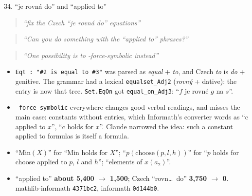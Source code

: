 \documentclass[10pt,aspectratio=169]{beamer}
\newcommand{\bad}[1]{\textcolor{warn}{#1}}
\newcommand{\ok}[1]{\textcolor{good}{#1}}
\newcommand{\commit}[1]{\texttt{\footnotesize #1}}
\newcommand{\prompt}[1]{\begin{quote}\small\itshape ``#1''\end{quote}}
\begin{document}
\begin{frame}{34. ``je rovná do'' and ``applied to''}
  \footnotesize
  \prompt{fix the Czech ``je rovná do'' equations} \prompt{Can you do something with the
  ``applied to'' phrases?} \prompt{One possibility is to -force-symbolic instead}
  \begin{itemize}
    \item \texttt{Eqt : "\#2 is equal to \#3"} was parsed as \emph{equal} + \emph{to}, and Czech
          \emph{to} is \emph{do} + genitive. The grammar had a lexical \texttt{equalset\_Adj2}
          (\emph{rovný} + dative): the entry is now that tree. \texttt{Set.EqOn} got
          \texttt{equal\_on\_Adj3}: ``$f$ je rovné $g$ na $s$''.
    \item \texttt{-force-symbolic} everywhere changes good verbal readings, and misses the main
          case: \bad{constants without entries}, which Informath's converter words as ``c applied
          to $x$'', ``c holds for $x$''. Claude narrowed the idea: such a constant applied to
          formulas is itself a formula.
    \item ``\ok{$\mathrm{Min}(X)$}'' for ``Min holds for $X$''; ``$p(\mathrm{choose}(p, l, h))$''
          for ``$p$ holds for choose applied to $p$, $l$ and $h$''; ``elements of $x(a_2)$''.
    \item ``applied to'' \textbf{about 5,400 $\to$ 1,500}; Czech ``rovn\ldots\ do'' \textbf{3,750
          $\to$ 0}. mathlib-informath \commit{4371bc2}, informath \commit{0d144b0}.
  \end{itemize}
\end{frame}
\end{document}
